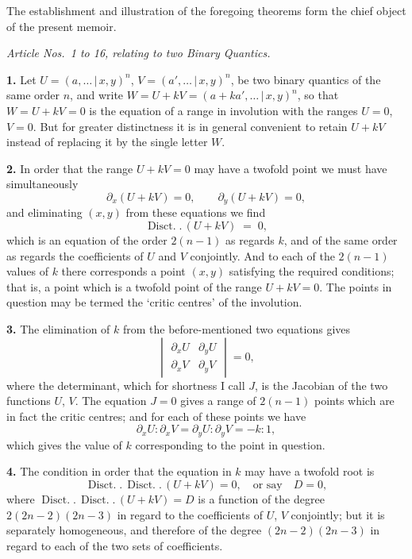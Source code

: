 \documentclass[11pt,a4paper]{article}
\providecommand{\mid}{\,|\,}
\providecommand{\Disct}{\operatorname{Disct.}}
\begin{document}
The establishment and illustration of the foregoing theorems form the chief object of the present memoir.

\begin{center}
\textit{Article Nos.~1 to 16, relating to two Binary Quantics.}
\end{center}

\textbf{1.} Let $U = (a, \ldots \mid x, y)^n$, $V = (a', \ldots \mid x, y)^n$, be two binary quantics of the same order $n$, and write $W = U + kV = (a + ka', \ldots \mid x, y)^n$, so that $W = U + kV = 0$ is the equation of a range in involution with the ranges $U = 0$, $V = 0$. But for greater distinctness it is in general convenient to retain $U + kV$ instead of replacing it by the single letter $W$.

\medskip

\textbf{2.} In order that the range $U + kV = 0$ may have a twofold point we must have simultaneously
\[
\partial_x(U + kV) = 0,\qquad \partial_y(U + kV) = 0,
\]
and eliminating $(x, y)$ from these equations we find
\[
\Disct.\,(U + kV) \;=\; 0,
\]
which is an equation of the order $2(n-1)$ as regards $k$, and of the same order as regards the coefficients of $U$ and $V$ conjointly. And to each of the $2(n-1)$ values of $k$ there corresponds a point $(x, y)$ satisfying the required conditions; that is, a point which is a twofold point of the range $U + kV = 0$. The points in question may be termed the `critic centres' of the involution.

\medskip

\textbf{3.} The elimination of $k$ from the before-mentioned two equations gives
\[
\begin{vmatrix} \partial_x U & \partial_y U \\ \partial_x V & \partial_y V \end{vmatrix} = 0,
\]
where the determinant, which for shortness I call $J$, is the Jacobian of the two functions $U$, $V$. The equation $J = 0$ gives a range of $2(n-1)$ points which are in fact the critic centres; and for each of these points we have
\[
\partial_x U : \partial_x V = \partial_y U : \partial_y V = -k : 1,
\]
which gives the value of $k$ corresponding to the point in question.

\medskip

\textbf{4.} The condition in order that the equation in $k$ may have a twofold root is
\[
\Disct.\,\Disct.\,(U + kV) = 0,\quad\text{or say}\quad D = 0,
\]
where $\Disct.\,\Disct.\,(U + kV) = D$ is a function of the degree $2(2n-2)(2n-3)$ in regard to the coefficients of $U$, $V$ conjointly; but it is separately homogeneous, and therefore of the degree $(2n-2)(2n-3)$ in regard to each of the two sets of coefficients.
\end{document}
